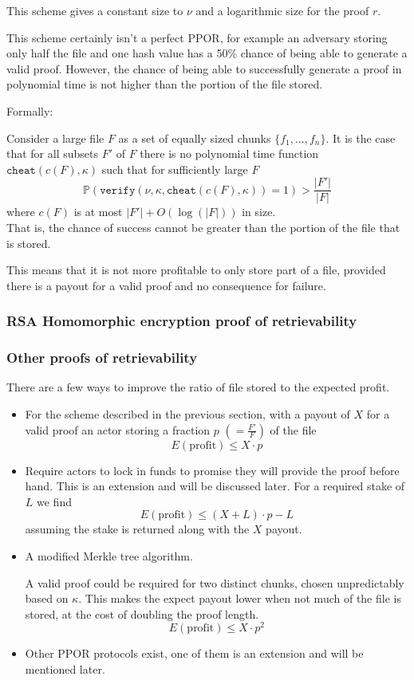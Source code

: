 \documentclass[10pt,twoside,a4paper]{article}
\begin{document}
This scheme gives a constant size to $\nu$ and a logarithmic size for the proof $r$.

This scheme certainly isn't a perfect PPOR, for example an adversary storing only half the file and one hash value has a 50\% chance of being able to generate a valid proof.
However, the chance of being able to successfully generate a proof in polynomial time is not higher than the portion of the file stored.

Formally:

Consider a large file $F$ as a set of equally sized chunks $\{f_1, ..., f_n\}$.
It is the case that
for all subsets $F'$ of $F$
there is no polynomial time function $\texttt{cheat}(c(F), \kappa)$ such that for sufficiently large $F$
\[\mathbb{P}(\texttt{verify}(\nu, \kappa, \texttt{cheat}(c(F), \kappa)) = 1) > \frac{|F'|}{|F|}\]
where $c(F)$ is at most $|F'| + O(\log(|F|))$ in size.\\
That is, the chance of success cannot be greater than the portion of the file that is stored.

This means that it is not more profitable to only store part of a file, provided there is a payout for a valid proof and no consequence for failure.


\subsubsection{RSA Homomorphic encryption proof of retrievability}




\subsubsection{Other proofs of retrievability}

There are a few ways to improve the ratio of file stored to the expected profit.
\begin{itemize}
\item For the scheme described in the previous section, with a payout of $X$ for a valid proof an actor storing a fraction $p$ $\left(=\frac{F'}{F}\right)$ of the file
\[E(\text{profit}) \leq X \cdot p\]

\item Require actors to lock in funds to promise they will provide the proof before hand.
This is an extension and will be discussed later. For a required stake of $L$ we find
\[E(\text{profit}) \leq (X + L) \cdot p - L\]
assuming the stake is returned along with the $X$ payout.

\item A modified Merkle tree algorithm.

A valid proof could be required for two distinct chunks, chosen unpredictably based on $\kappa$.
This makes the expect payout lower when not much of the file is stored, at the cost of doubling the proof length.
\[E(\text{profit}) \leq X \cdot p^2\]

\item Other PPOR protocols exist, one of them is an extension and will be mentioned later.
\end{itemize}
\end{document}
